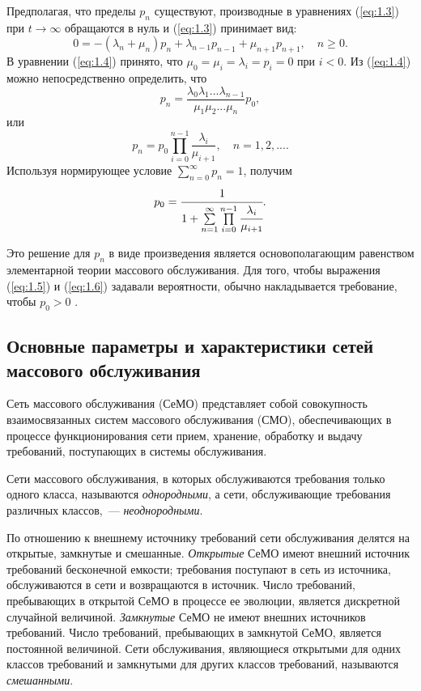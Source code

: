 Предполагая, что пределы ${p_n}$ существуют, производные в уравнениях (\ref{eq:1.3}) при $t \to \infty$ обращаются в нуль и (\ref{eq:1.3}) принимает вид:
\begin{equation}
0 =  - ({\lambda_n} + {\mu_n}){p_n} + {\lambda _{n - 1}}{p_{n - 1}} + {\mu _{n + 1}}{p_{n + 1}},\quad n \ge 0.
\label{eq:1.4}
\end{equation}
В уравнении (\ref{eq:1.4}) принято, что ${\mu _0} = {\mu_i} = {\lambda_i} = {p_i} = 0$ при $i < 0$. Из (\ref{eq:1.4}) можно непосредственно определить, что
\[{p_n} = \frac{{{\lambda _0}{\lambda_1}...{\lambda _{n - 1}}}}{{{\mu _1}{\mu_2}...{\mu_n}}}{p_0} ,\]
или
\begin{equation}
{p_n} = {p_0}\prod\limits_{i = 0}^{n - 1} {\frac{{{\lambda _i}}}{{{\mu _{i + 1}}}}} ,\quad n = 1,2,... .
\label{eq:1.5}
\end{equation}
Используя нормирующее условие $\sum\limits_{n = 0}^\infty  {{p_n}}  = 1$, получим
\begin{equation}
{p_0} = \cfrac{1}{{1 + \sum\limits_{n = 1}^\infty  {\prod\limits_{i = 0}^{n - 1} {\cfrac{{{\lambda _i}}}{{{\mu _{i + 1}}}}} } }} .
\label{eq:1.6}
\end{equation}

Это решение для ${p_n}$ в виде произведения является основополагающим равенством элементарной теории массового обслуживания. Для того, чтобы выражения (\ref{eq:1.5}) и (\ref{eq:1.6}) задавали вероятности, обычно накладывается требование, чтобы ${p_0} > 0$ \cite{mitrofanov}.

\newpage
\subsection{Основные параметры и характеристики сетей массового обслуживания}
\label{subsec:QN_param_and_char}

Сеть массового обслуживания (СеМО) представляет собой совокупность взаимосвязанных систем массового обслуживания (СМО), обеспечивающих в процессе функционирования сети прием, хранение, обработку и выдачу требований, поступающих в системы обслуживания.

Сети массового обслуживания, в которых обслуживаются требования только одного класса, называются \textit{однородными}, а сети, обслуживающие требования различных классов,~--- \textit{неоднородными}.

По отношению к внешнему источнику требований сети обслуживания делятся на открытые, замкнутые и смешанные. \textit{Открытые} СеМО имеют внешний источник требований бесконечной емкости; требования поступают в сеть из источника, обслуживаются в сети и возвращаются в источник. Число требований, пребывающих в открытой СеМО в процессе ее эволюции, является дискретной случайной величиной. \textit{Замкнутые} СеМО не имеют внешних источников требований. Число требований, пребывающих в замкнутой СеМО, является постоянной величиной. Сети обслуживания, являющиеся открытыми для одних классов требований и замкнутыми для других классов требований, называются \textit{смешанными}.

